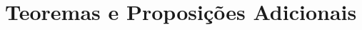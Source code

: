 \chapter{Teoremas e Proposições Adicionais}\label{app:theorems}
\finiteProductOfOpenSetsIsOpen
\metrizableSeparableSpaceIsSecondCountable
\rnIsSeparable
\basisOfR